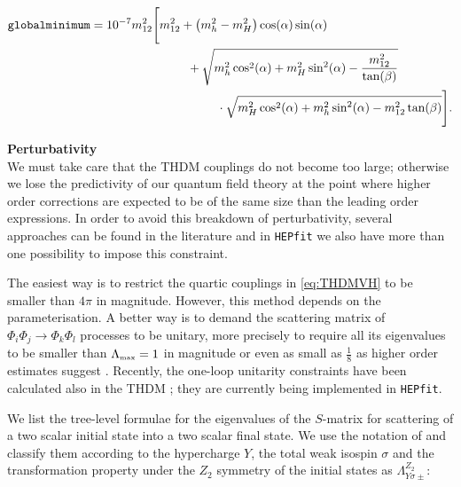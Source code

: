 \documentclass[aps,superscriptaddress,nofootinbib,floatfix,notitlepage]{revtex4-1}
\newcommand{\HEPfit}{\texttt{HEPfit}\xspace}
\begin{document}
\begin{align}
 \tt{globalminimum} &= 10^{-7} m_{12}^2 \Bigg[ m_{12}^2 + \left( m_h^2 - m_H^2 \right) \cos (\alpha) \sin (\alpha) \phantom{Bigg]} \nonumber \\
 & \hspace*{80pt} +\sqrt{ m_h^2 \cos^2(\alpha) +m_H^2 \sin^2(\alpha) - \frac{m_{12}^2}{\tan(\beta)} } \nonumber \\
 & \hspace*{80pt} \phantom{Bigg[} \cdot \sqrt{ m_H^2 \cos^2(\alpha) +m_h^2 \sin^2(\alpha) -m_{12}^2 \tan (\beta ) } \Bigg] .\nonumber
\end{align}

\textbf{Perturbativity}\\

We must take care that the THDM couplings do not become too large; otherwise we lose the predictivity of our quantum field theory at the point where higher order corrections are expected to be of the same size than the leading order expressions. In order to avoid this breakdown of perturbativity, several approaches can be found in the literature and in \HEPfit we also have more than one possibility to impose this constraint.

The easiest way is to restrict the quartic couplings in \eqref{eq:THDMVH} to be smaller than $4\pi$ in magnitude. However, this method depends on the parameterisation. A better way is to demand the scattering matrix of $\Phi_i \Phi_j\to \Phi_k \Phi_l$ processes to be unitary, more precisely to require all its eigenvalues to be smaller than $\Lambda_{\text{\tiny{max}}}=1$ in magnitude \cite{Huffel:1980sk,Maalampi:1991fb,Kanemura:1993hm,Akeroyd:2000wc,Ginzburg:2005dt} or even as small as $\frac18$ as higher order estimates suggest \cite{Baglio:2014nea,Chowdhury:2015yja}. Recently, the one-loop unitarity constraints have been calculated also in the THDM \cite{Grinstein:2015rtl}; they are currently being implemented in \HEPfit.

We list the tree-level formulae for the eigenvalues of the $S$-matrix for scattering of a two scalar initial state into a two scalar final state. We use the notation of \cite{Ginzburg:2005dt} and classify them according to the hypercharge $Y$, the total weak isospin $\sigma$ and the transformation property under the $Z_2$ symmetry of the initial states as $\Lambda _{Y\sigma \pm}^{Z_2}$:
\end{document}
